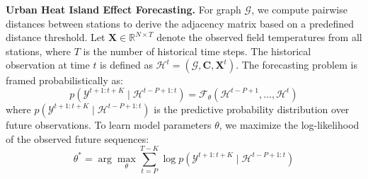 \begin{problem}

\textbf{Urban Heat Island Effect Forecasting.} For graph $\mathcal{G}$, we compute pairwise distances between stations to derive the adjacency matrix based on a predefined distance threshold. Let  $\mathbf{X} \in \mathbb{R}^{N \times T}$ denote the observed field temperatures from all stations, where $T$ is the number of historical time steps. The historical observation at time $t$ is defined as $\mathcal{H}^{t} = (\mathcal{G}, \mathbf{C}, \mathbf{X}^{t})$. The forecasting problem is framed probabilistically as:
\begin{equation}
p\left(\mathcal{Y}^{t+1:t+K} \mid \mathcal{H}^{t-P+1:t}\right) = \mathcal{F}_\theta\left(\mathcal{H}^{t-P+1}, \dots, \mathcal{H}^t\right)
\end{equation}
where $p\left(\mathcal{Y}^{t+1:t+K} \mid \mathcal{H}^{t-P+1:t}\right)$ is the predictive probability distribution over future observations. To learn model parameters $\theta$, we maximize the log-likelihood of the observed future sequences:
\begin{equation}
\theta^* = \arg\max_\theta \sum_{t=P}^{T - K} \log p\left(\mathcal{Y}^{t+1:t+K} \mid \mathcal{H}^{t-P+1:t}\right)    
\end{equation}
\end{problem}






